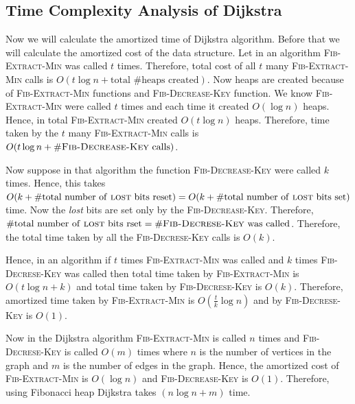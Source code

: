 \subsection{Time Complexity Analysis of Dijkstra}

Now we will calculate the amortized time of Dijkstra algorithm. Before that we will calculate the amortized cost of the data structure. Let in an algorithm  \textsc{Fib-Extract-Min} was called $t$ times. Therefore, total cost of all $t$ many \textsc{Fib-Extract-Min} calls is $O(t\log n+\text{total $\#$heaps created})$. Now heaps are created because of \textsc{Fib-Extract-Min} functions and \textsc{Fib-Decrease-Key} function. We know \textsc{Fib-Extract-Min} were called $t$ times and each time it created $O(\log n)$ heaps. Hence, in total \textsc{Fib-Extract-Min} created $O(t\log n)$ heaps. Therefore, time taken by the $t$ many \textsc{Fib-Extract-Min} calls is $O(t\log n+\#\textsc{Fib-Decrease-Key}\text{ calls})$.

Now suppose in that algorithm the function \textsc{Fib-Decrease-Key} were called $k$ times. Hence, this takes $O(k+\#\text{total number of \textsc{lost} bits reset})=O(k+\#\text{total number of \textsc{lost} bits set})$ time. Now the \emph{lost} bits are set only by the \textsc{Fib-Decrease-Key}. Therefore, $\#\text{total number of \textsc{lost} bits rset}=\#\text{\textsc{Fib-Decrese-Key} was called}$. Therefore, the total time taken by all the \textsc{Fib-Decrese-Key} calls is $O(k)$.

Hence, in an algorithm if $t$ times \textsc{Fib-Extract-Min} was called and $k$ times \textsc{Fib-Decrese-Key} was called then total time taken by \textsc{Fib-Extract-Min} is $O(t\log n+k)$ and total time taken by \textsc{Fib-Decrese-Key} is $O(k)$. Therefore, amortized time taken by \textsc{Fib-Extract-Min} is $O(\frac{t}{k}\log n)$ and by \textsc{Fib-Decrese-Key} is $O(1)$.

Now in the Dijkstra algorithm \textsc{Fib-Extract-Min} is called $n$ times and \textsc{Fib-Decrese-Key} is called $O(m)$ times where $n$ is the number of vertices in the graph and $m$ is the number of edges in the graph. Hence, the amortized cost of \textsc{Fib-Extract-Min} is $O(\log n)$ and \textsc{Fib-Decrease-Key} is $O(1)$. Therefore, using Fibonacci heap Dijkstra takes $(n\log n+m)$ time.
